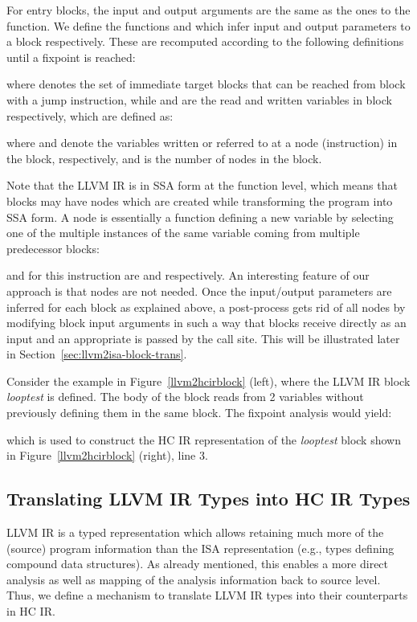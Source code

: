 \documentclass{llncs}
\newcommand{\hcir}{HC IR\xspace}
\newcommand{\llvmir}{LLVM IR\xspace}
\begin{document}
For entry blocks, the input and output arguments are the same as the ones to the function.
We define the functions
 and  which infer input and output parameters
to a block respectively. 
These are recomputed according to the following definitions until a
fixpoint is reached:

where  denotes the set of immediate target blocks
that can be reached from block  with a jump instruction, while 
and  are the read and written variables in block 
respectively, which are defined as:

where  and  denote the variables
written or referred to at a node (instruction)  in the block,
respectively, and  is the number of nodes in the block.

Note that the \llvmir is in SSA form at the function level, which
means that blocks may have  nodes which are created while
transforming the program into SSA form. A  node is essentially a
function defining a new variable by selecting one of the multiple
instances of the same variable coming from multiple predecessor
blocks:
\begin{center}

\end{center}
 and  for this instruction are  and  respectively. 
An interesting feature of our approach is that  nodes are not
needed. Once the input/output parameters are inferred for each block
as explained above, a post-process gets rid of all  nodes by
modifying block input arguments in such a way that blocks receive 
directly as an input and an appropriate  is passed by the call
site. This will be illustrated later in
Section~\ref{sec:llvm2isa-block-trans}.


Consider the example in Figure~\ref{llvm2hcirblock} (left), where the \llvmir
block \textit{looptest} is defined. The body of the block reads from 2
variables without previously defining them in the same block. The
fixpoint analysis would yield:
\begin{center}

\end{center}
which is used to construct the \hcir representation of the \textit{looptest}
block shown in Figure~\ref{llvm2hcirblock} (right), line 3.

\subsection{Translating \llvmir Types into \hcir Types} 

\llvmir is a typed representation which allows retaining much more of
the (source) program information than the ISA representation (e.g.,
types defining compound data structures).
As already mentioned, this enables a more direct analysis as well as
mapping of the analysis information back to source level.
Thus, we define a mechanism to translate \llvmir types into their
counterparts in \hcir.
\end{document}
